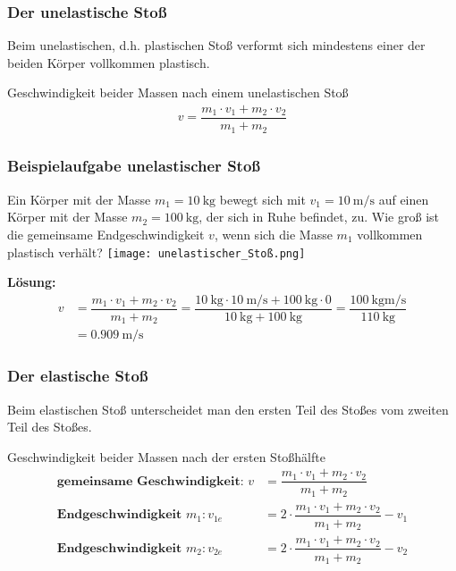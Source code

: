 \documentclass{article}
\begin{document}
\frame
{
  \frametitle{Der unelastische Stoß}
  Beim unelastischen, d.h. plastischen Stoß verformt sich mindestens einer der beiden Körper vollkommen plastisch.
  \begin{block}{Geschwindigkeit beider Massen nach einem unelastischen Stoß}
	\begin{align*}
	v=\dfrac{m_1\cdot v_1+m_2\cdot v_2}{m_1+m_2}
	\end{align*}
  \end{block}
}

\frame
{
{
  \frametitle{Beispielaufgabe unelastischer Stoß}
Ein Körper mit der Masse $m_1=\SI{10}{\kilogram}$ bewegt sich mit $v_1=\SI{10}{\meter\per\second}$ auf einen Körper mit der Masse $m_2=\SI{100}{\kilogram}$, der sich in Ruhe befindet, zu. Wie groß ist die gemeinsame Endgeschwindigkeit $v$, wenn sich die Masse $m_1$ vollkommen plastisch verhält?
\texttt{[image: unelastischer\_Stoß.png]}\\
}
{
\textbf{Lösung:}	
	\begin{align*}
	v&=\dfrac{m_1\cdot v_1+m_2\cdot v_2}{m_1+m_2}=\dfrac{\SI{10}{\kilogram}\cdot \SI{10}{\meter\per\second}+\SI{100}{\kilogram}\cdot 0}{\SI{10}{\kilogram}+\SI{100}{\kilogram}}=\dfrac{\SI{100}{\kilogram\meter\per\second}}{\SI{110}{\kilogram}}\\&=\SI{0,909}{\meter\per\second}
	\end{align*}
}
}

\frame
{
  \frametitle{Der elastische Stoß}
  Beim elastischen Stoß unterscheidet man den ersten Teil des Stoßes vom zweiten Teil des Stoßes.
  \begin{block}{Geschwindigkeit beider Massen nach der ersten Stoßhälfte}
	\begin{align*}
	\textbf{gemeinsame Geschwindigkeit: }v&=\dfrac{m_1\cdot v_1+m_2\cdot v_2}{m_1+m_2}\\
	\textbf{Endgeschwindigkeit }m_1:v_{1e}&=2\cdot\dfrac{m_1\cdot v_1+m_2\cdot v_2}{m_1+m_2}-v_1\\
	\textbf{Endgeschwindigkeit }m_2:v_{2e}&=2\cdot\dfrac{m_1\cdot v_1+m_2\cdot v_2}{m_1+m_2}-v_2\\
	\end{align*}
  \end{block}
}
\end{document}

